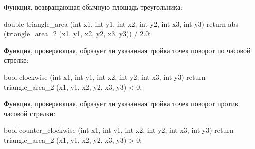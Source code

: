 Функция, возвращающая обычную площадь треугольника:

\code
double triangle_area (int x1, int y1, int x2, int y2, int x3, int y3) {
	return abs (triangle_area_2 (x1, y1, x2, y2, x3, y3)) / 2.0;
}
\endcode

Функция, проверяющая, образует ли указанная тройка точек поворот по часовой стрелке:

\code
bool clockwise (int x1, int y1, int x2, int y2, int x3, int y3) {
	return triangle_area_2 (x1, y1, x2, y2, x3, y3) < 0;
}
\endcode

Функция, проверяющая, образует ли указанная тройка точек поворот против часовой стрелки:

\code
bool counter_clockwise (int x1, int y1, int x2, int y2, int x3, int y3) {
	return triangle_area_2 (x1, y1, x2, y2, x3, y3) > 0;
}
\endcode